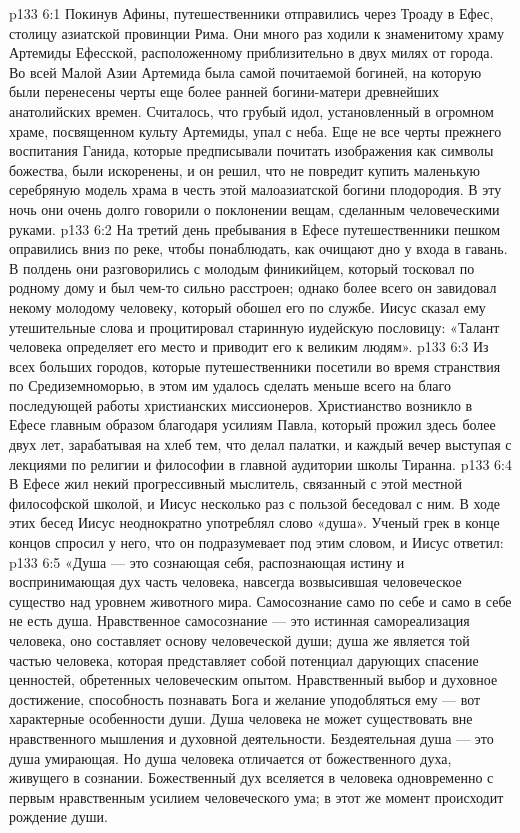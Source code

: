 \vs p133 6:1 Покинув Афины, путешественники отправились через Троаду в Ефес, столицу азиатской провинции Рима. Они много раз ходили к знаменитому храму Артемиды Ефесской, расположенному приблизительно в двух милях от города. Во всей Малой Азии Артемида была самой почитаемой богиней, на которую были перенесены черты еще более ранней богини\hyp{}матери древнейших анатолийских времен. Считалось, что грубый идол, установленный в огромном храме, посвященном культу Артемиды, упал с неба. Еще не все черты прежнего воспитания Ганида, которые предписывали почитать изображения как символы божества, были искоренены, и он решил, что не повредит купить маленькую серебряную модель храма в честь этой малоазиатской богини плодородия. В эту ночь они очень долго говорили о поклонении вещам, сделанным человеческими руками.
\vs p133 6:2 На третий день пребывания в Ефесе путешественники пешком оправились вниз по реке, чтобы понаблюдать, как очищают дно у входа в гавань. В полдень они разговорились с молодым финикийцем, который тосковал по родному дому и был чем\hyp{}то сильно расстроен; однако более всего он завидовал некому молодому человеку, который обошел его по службе. Иисус сказал ему утешительные слова и процитировал старинную иудейскую пословицу: «Талант человека определяет его место и приводит его к великим людям».
\vs p133 6:3 Из всех больших городов, которые путешественники посетили во время странствия по Средиземноморью, в этом им удалось сделать меньше всего на благо последующей работы христианских миссионеров. Христианство возникло в Ефесе главным образом благодаря усилиям Павла, который прожил здесь более двух лет, зарабатывая на хлеб тем, что делал палатки, и каждый вечер выступая с лекциями по религии и философии в главной аудитории школы Тиранна.
\vs p133 6:4 В Ефесе жил некий прогрессивный мыслитель, связанный с этой местной философской школой, и Иисус несколько раз с пользой беседовал с ним. В ходе этих бесед Иисус неоднократно употреблял слово «душа». Ученый грек в конце концов спросил у него, что он подразумевает под этим словом, и Иисус ответил:
\vs p133 6:5 \pc «Душа --- это сознающая себя, распознающая истину и воспринимающая дух часть человека, навсегда возвысившая человеческое существо над уровнем животного мира. Самосознание само по себе и само в себе не есть душа. Нравственное самосознание --- это истинная самореализация человека, оно составляет основу человеческой души; душа же является той частью человека, которая представляет собой потенциал дарующих спасение ценностей, обретенных человеческим опытом. Нравственный выбор и духовное достижение, способность познавать Бога и желание уподобляться ему --- вот характерные особенности души. Душа человека не может существовать вне нравственного мышления и духовной деятельности. Бездеятельная душа --- это душа умирающая. Но душа человека отличается от божественного духа, живущего в сознании. Божественный дух вселяется в человека одновременно с первым нравственным усилием человеческого ума; в этот же момент происходит рождение души.
